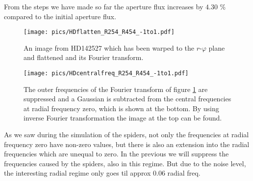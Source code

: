 From the steps we have made so far the aperture flux increases by $4.30$ \% compared to the initial aperture flux. 
\begin{figure}[H]
	\centering
		\texttt{[image: pics/HDflatten\_R254\_R454\_-1to1.pdf]}
		\caption{An image from HD142527 which has been warped to the $r$-$\varphi$ plane and flattened and its Fourier transform.}
		\label{fig:HDflatten_R254_R454_-1to1}
\end{figure}
\begin{figure}[H]
	\centering
		\texttt{[image: pics/HDcentralfreq\_R254\_R454\_-1to1.pdf]}
		\caption{The outer frequencies of the Fourier transform of figure \ref{fig:HDflatten_R254_R454_-1to1} are suppressed and a Gaussian is subtracted from the central frequencies at radial frequency zero, which is shown at the bottom. By using inverse Fourier transformation the image at the top can be found.}
		\label{fig:HDcentralfreq_R254_R454_-1to1}
\end{figure}

As we saw during the simulation of the spiders, not only the frequencies at radial frequency zero have non-zero values, but there is also an extension into the radial frequencies which are unequal to zero. In the previous we will suppress the frequencies caused by the spiders, also in this regime.
But due to the noise level, the interesting radial regime only goes til approx 0.06 radial freq. 